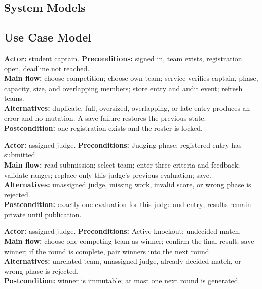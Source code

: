 \documentclass[12pt]{article}
\begin{document}
\begin{umlpage}
\section{System Models}
\subsection{Use Case Model}
\end{umlpage}
\begin{contentbox}
\textbf{Actor:} student captain. \textbf{Preconditions:} signed in, team exists, registration open, deadline not reached.\\
\textbf{Main flow:} choose competition; choose own team; service verifies captain, phase, capacity, size, and overlapping members; store entry and audit event; refresh teams.\\
\textbf{Alternatives:} duplicate, full, oversized, overlapping, or late entry produces an error and no mutation. A save failure restores the previous state.\\
\textbf{Postcondition:} one registration exists and the roster is locked.
\end{contentbox}
\begin{contentbox}
\textbf{Actor:} assigned judge. \textbf{Preconditions:} Judging phase; registered entry has submitted.\\
\textbf{Main flow:} read submission; select team; enter three criteria and feedback; validate ranges; replace only this judge's previous evaluation; save.\\
\textbf{Alternatives:} unassigned judge, missing work, invalid score, or wrong phase is rejected.\\
\textbf{Postcondition:} exactly one evaluation for this judge and entry; results remain private until publication.
\end{contentbox}
\begin{contentbox}
\textbf{Actor:} assigned judge. \textbf{Preconditions:} Active knockout; undecided match.\\
\textbf{Main flow:} choose one competing team as winner; confirm the final result; save winner; if the round is complete, pair winners into the next round.\\
\textbf{Alternatives:} unrelated team, unassigned judge, already decided match, or wrong phase is rejected.\\
\textbf{Postcondition:} winner is immutable; at most one next round is generated.
\end{contentbox}
\end{document}
